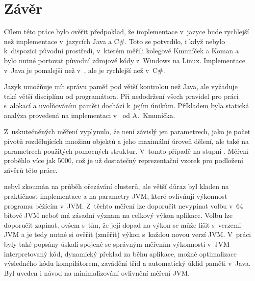 \chapter{Závěr}

Cílem této práce bylo ověřit předpoklad, že implementace  v~jazyce \CC{} bude rychlejší než implementace v~jazycích Java a C\#.
Toto se potvrdilo, i když nebylo k~dispozici původní prostředí, v~kterém měřili kolegové Kmuníček a Koman a bylo nutné portovat původní zdrojové kódy \CC{} z~Windows na Linux.
Implementace v~Java je pomalejší než v~\CC, ale je rychlejší než v~C\#.

Jazyk \CC{} umožňuje mít správu paměť pod větší kontrolou než Java, ale vyžaduje také větší disciplínu od programátora.
Při nedodržení všech pravidel pro práci s~alokací a uvolňováním paměti dochází k~jejím únikům.
Příkladem byla statická analýza provedená na implementaci v~\CC{} od A.~Kmuníčka.

Z~uskutečněných měření vyplynulo, že \MIndex{} není závislý jen parametrech, jako je počet pivotů rozdělujících množinu objektů a jeho maximální úroveň dělení, ale také na parametrech použitých pomocných struktur.
V~tomto případě na stupni \BPTree.
Měření proběhlo více jak 5000, což je už dostatečný reprezentační vzorek pro podložení závěrů této práce.

\MIndex{} nebyl zkoumán na průběh ořezávání clusterů, ale větší důraz byl kladen na praktičnost implementace a na parametry JVM, které ovlivňují výkonnost programu běžícím v~JVM.
Z~těchto měření lze doporučit nevypínat volbu  v~64 bitové JVM neboť má zásadní význam na celkový výkon aplikace.
Volbu  lze doporučit zapínat, ovšem s~tím, že její dopad na výkon se může lišit s~verzemi JVM a je tedy nutné si ověřit (změřit) výkon s~každou novou verzí JVM.
V~práci byly také popsány úskalí spojené se správným měřením výkonnosti v~JVM -- interpretovaný kód, dynamický překlad \bytecode{} za běhu aplikace, možné optimalizace výsledného kódu kompilátorem, zavádění tříd a automatický úklid paměti v~Java.
Byl uveden i návod na minimalizování ovlivnění měření  JVM.

